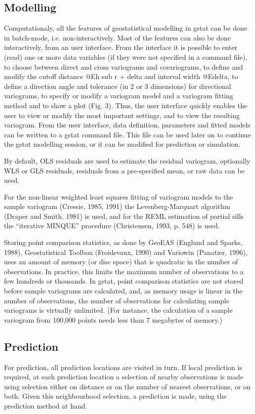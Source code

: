 \documentclass{article}
\begin{document}
\subsection{Modelling}
Computationaly, all the features of geostatistical modelling in gstat
can be done in batch-mode, i.e. non-interactively. Most of the features
can also be done interactively, from an user interface. From the
interface it is possible to enter (read) one or more data variables (if
they were not specified in a command file), to choose between direct and
cross variograms and covariograms, to define and modify the cutoff
distance @E{h sub r + delta} and interval width @E{delta}, to define a
direction angle and tolerance (in 2 or 3 dimensions) for directional
variograms, to specify or modify a variogram model and a variogram
fitting method and to show a plot (Fig. 3). Thus, the user interface
quickly enables the user to view or modify the most important settings,
and to view the resulting variogram. From the user interface, data
definition, parameters and fitted models can be written to a gstat
command file. This file can be used later on to continue the gstat
modelling session, or it can be modified for prediction or simulation.

By default, OLS residuals are used to estimate the residual variogram,
optionally WLS or GLS residuals, residuals from a pre-specified mean, or
raw data can be used.

For the non-linear weighted least squares fitting of variogram models
to the sample variogram (Cressie, 1985, 1991) the Levenberg-Marquart
algorithm (Draper and Smith, 1981) is used, and for the REML estimation
of partial sills the ``iterative MINQUE'' procedure (Christensen, 1993,
p. 548) is used.

Storing point comparison statistics, as done by GeoEAS (Englund and
Sparks, 1988), Geostatistical Toolbox (Froidevaux, 1990) and Variowin
(Panatier, 1996), uses an amount of memory (or disc space) that is
quadratic in the number of observations. In practice, this limits the
maximum number of observations to a few hundreds or thousands. In gstat,
point comparison statistics are not stored before sample variograms are
calculated, and, as memory usage is linear in the number of
observations, the number of observations for calculating sample
variograms is virtually unlimited. (For instance, the calculation of a
sample variogram from 100,000 points needs less than 7 megabytes of
memory.)

\subsection{Prediction}
For prediction, all prediction locations are visited in turn. If local
prediction is required, at each prediction location a selection of
nearby observations is made using selection either on distance or on the
number of nearest observations, or on both. Given this neighbourhood
selection, a prediction is made, using the prediction method at hand.
\end{document}
